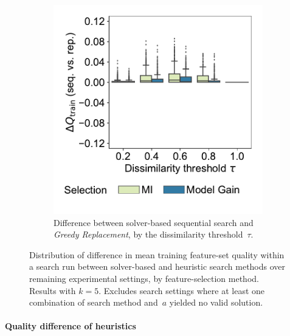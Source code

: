 \documentclass{article}
\theoremstyle{definition}
\begin{document}
\begin{figure}[p]
\begin{subfigure}[t]{0.48\textwidth}
		\includegraphics[width=\textwidth, trim=15 30 15 15, clip]{plots/afs-impact-search-heuristics-metric-diff-seq-tau.pdf}
		\caption{
			Difference between solver-based sequential search and \emph{Greedy Replacement}, by the dissimilarity threshold~$\tau$.
		}
		\label{fig:afs:impact-search-heuristics-metric-diff-seq-tau}
	\end{subfigure}
	\caption{
		Distribution of difference in mean training feature-set quality within a search run between solver-based and heuristic search methods over remaining experimental settings, by feature-selection method.
		Results with $k=5$.
		Excludes search settings where at least one combination of search method and~$a$ yielded no valid solution.
	}
	\label{fig:afs:impact-search-heuristics-metric-diff}
\end{figure}

\paragraph{Quality difference of heuristics}
\end{document}
